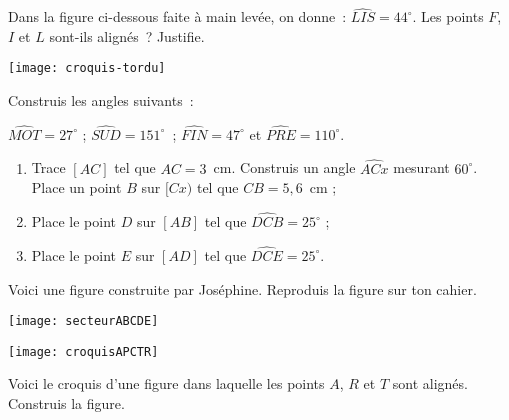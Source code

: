 \begin{exercice}[Alignés ?]
Dans la figure ci-dessous faite à main levée, on donne : $\widehat{LIS}= 44^\circ$.
Les points $F$, $I$ et $L$ sont-ils alignés ? Justifie.
 \begin{center} \texttt{[image: croquis-tordu]} \end{center}
\end{exercice} 




\begin{exercice}
Construis les angles suivants :

$\widehat{MOT} = 27^\circ$ ; $\widehat{SUD} = 151^\circ$ ; $\widehat{FIN} = 47^\circ$ et $\widehat{PRE} = 110^\circ$.
\end{exercice} 


\begin{exercice}
\begin{enumerate}
\item Trace $[AC]$ tel que $AC = 3$ cm. Construis un angle $\widehat{ACx}$ mesurant $60^\circ$. Place un point $B$ sur $[Cx)$ tel que $CB = 5,6$ cm ;
\item Place le point $D$ sur $[AB]$ tel que $\widehat{DCB} = 25^\circ$ ;
\item Place le point $E$ sur $[AD]$ tel que $\widehat{DCE} = 25^\circ$.
\end{enumerate}
\end{exercice} 


\begin{exercice}
Voici une figure construite par Joséphine. Reproduis la figure sur ton cahier.
 \begin{center} \texttt{[image: secteurABCDE]} \end{center}
\end{exercice} 


\begin{exercice}
 \begin{center} \texttt{[image: croquisAPCTR]} \end{center}
 Voici le croquis d’une figure dans laquelle les points $A$, $R$ et $T$ sont alignés. Construis la figure.
\end{exercice} 



